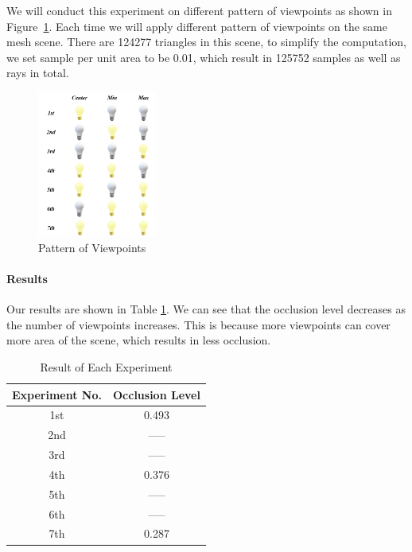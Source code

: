 \documentclass[11pt, a4paper,oneside,chapterprefix=false]{scrbook}
\begin{document}
We will conduct this experiment on different pattern of viewpoints as shown in Figure~\ref{fig:pattern of viewpoints}. Each time we will apply different pattern of viewpoints on the same mesh scene. There are 124277 triangles in this scene, to simplify the computation, we set sample per unit area to be 0.01, which result in 125752 samples as well as rays in total.
\noindent
\begin{minipage}{\textwidth}
	\begin{figure}[H]
		\centering
		\includegraphics*[width=0.35\textwidth]{figures/experiment mesh.png}
		\caption{Pattern of Viewpoints}
		\label{fig:pattern of viewpoints}
	\end{figure}
\end{minipage} 

\paragraph{Results}

Our results are shown in Table \ref{tab:result of each experiment}. We can see that the occlusion level decreases as the number of viewpoints increases. This is because more viewpoints can cover more area of the scene, which results in less occlusion.

\begin{table}[h]
    \centering
    \begin{tabular}{|c|c|}
        \hline
        \textbf{Experiment No.} & \textbf{Occlusion Level} \\
        \hline
        1st & 0.493 \\
        2nd & ----- \\
		3rd & ----- \\
		4th & 0.376 \\
		5th & ----- \\
		6th & ----- \\
		7th & 0.287 \\
        \hline
    \end{tabular}
    \caption{Result of Each Experiment}
    \label{tab:result of each experiment}
\end{table}
\end{document}
